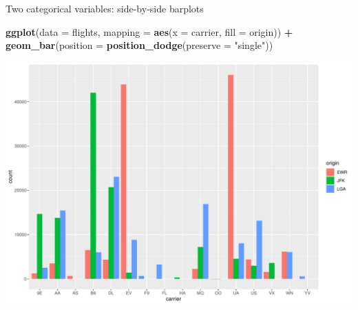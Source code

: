 \documentclass[
  ignorenonframetext,
]{beamer}
\newenvironment{Shaded}{\begin{snugshade}}{\end{snugshade}}
\newcommand{\AttributeTok}[1]{\textcolor[rgb]{0.13,0.29,0.53}{#1}}
\newcommand{\FunctionTok}[1]{\textcolor[rgb]{0.13,0.29,0.53}{\textbf{#1}}}
\newcommand{\NormalTok}[1]{#1}
\newcommand{\SpecialCharTok}[1]{\textcolor[rgb]{0.81,0.36,0.00}{\textbf{#1}}}
\newcommand{\StringTok}[1]{\textcolor[rgb]{0.31,0.60,0.02}{#1}}
\begin{document}
\begin{frame}[fragile]{Two categorical variables: side-by-side barplots}
\protect\hypertarget{two-categorical-variables-side-by-side-barplots-2}{}
\tiny

\begin{Shaded}
\begin{Highlighting}[]
\FunctionTok{ggplot}\NormalTok{(}\AttributeTok{data =}\NormalTok{ flights, }\AttributeTok{mapping =} \FunctionTok{aes}\NormalTok{(}\AttributeTok{x =}\NormalTok{ carrier, }\AttributeTok{fill =}\NormalTok{ origin)) }\SpecialCharTok{+}
  \FunctionTok{geom\_bar}\NormalTok{(}\AttributeTok{position =} \FunctionTok{position\_dodge}\NormalTok{(}\AttributeTok{preserve =} \StringTok{"single"}\NormalTok{))}
\end{Highlighting}
\end{Shaded}

\begin{center}\includegraphics[width=0.9\linewidth,height=0.5\textheight]{Week2_Lect_files/figure-beamer/unnamed-chunk-45-1} \end{center}
\normalsize
\end{frame}
\end{document}

